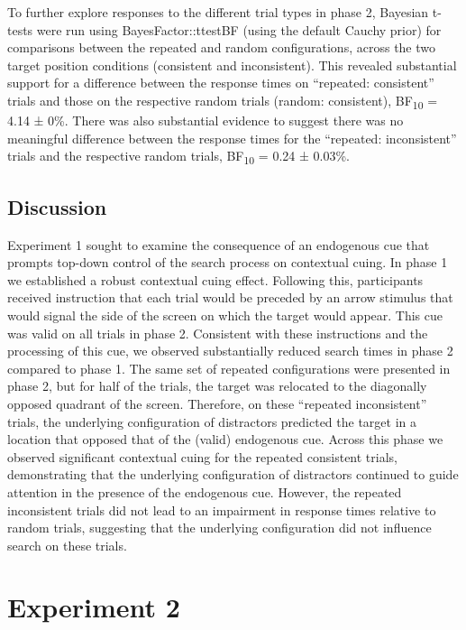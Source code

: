 \documentclass[
  man,
  floatsintext,
  longtable,
  nolmodern,
  notxfonts,
  notimes,
  colorlinks=true,linkcolor=blue,citecolor=blue,urlcolor=blue]{apa7}
\begin{document}
To further explore responses to the different trial types in phase 2,
Bayesian t-tests were run using BayesFactor::ttestBF (using the default
Cauchy prior) for comparisons between the repeated and random
configurations, across the two target position conditions (consistent
and inconsistent). This revealed substantial support for a difference
between the response times on ``repeated: consistent'' trials and those
on the respective random trials (random: consistent),
BF\textsubscript{10} = 4.14 ± 0\%. There was also substantial evidence
to suggest there was no meaningful difference between the response times
for the ``repeated: inconsistent'' trials and the respective random
trials, BF\textsubscript{10} = 0.24 ± 0.03\%.

\subsection{Discussion}\label{discussion}

Experiment 1 sought to examine the consequence of an endogenous cue that
prompts top-down control of the search process on contextual cuing. In
phase 1 we established a robust contextual cuing effect. Following this,
participants received instruction that each trial would be preceded by
an arrow stimulus that would signal the side of the screen on which the
target would appear. This cue was valid on all trials in phase 2.
Consistent with these instructions and the processing of this cue, we
observed substantially reduced search times in phase 2 compared to phase
1. The same set of repeated configurations were presented in phase 2,
but for half of the trials, the target was relocated to the diagonally
opposed quadrant of the screen. Therefore, on these ``repeated
inconsistent'' trials, the underlying configuration of distractors
predicted the target in a location that opposed that of the (valid)
endogenous cue. Across this phase we observed significant contextual
cuing for the repeated consistent trials, demonstrating that the
underlying configuration of distractors continued to guide attention in
the presence of the endogenous cue. However, the repeated inconsistent
trials did not lead to an impairment in response times relative to
random trials, suggesting that the underlying configuration did not
influence search on these trials.

\section{Experiment 2}\label{experiment-2}
\end{document}
